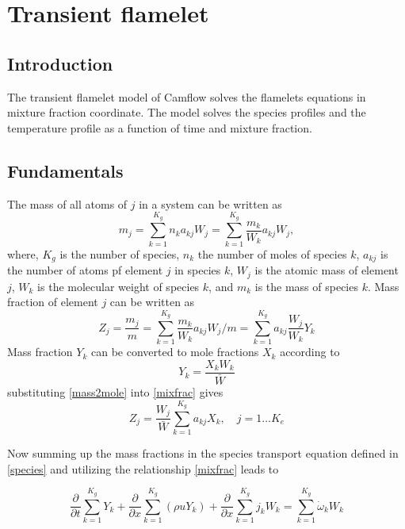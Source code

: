 \newpage
\chapter{Transient flamelet}
\section{Introduction}
The transient flamelet model of Camflow solves the flamelets equations in mixture fraction coordinate. The model solves the species profiles and the temperature profile as a function of time and mixture fraction.
\section{Fundamentals}
The mass of all atoms of $j$ in a system can be written as
\begin{equation}
 m_j = \sum_{k=1}^{K_g} n_ka_{kj}W_j = \sum_{k=1}^{K_g} \frac{m_k}{W_k}a_{kj}W_j,
\end{equation}
where, $K_g$ is the number of species, $n_k$ the number of moles of species $k$, $a_{kj}$ is the number of atoms pf element $j$ in species $k$, $W_j$ is the atomic mass of element $j$, $W_k$ is the molecular weight of species $k$, and $m_k$ is the mass of species $k$. Mass fraction of element $j$ can be written as 
\begin{equation}
 Z_j = \frac{m_j}{m} = \sum_{k=1}^{K_g} \frac{m_k}{W_k}a_{kj} W_j/m = \sum_{k=1}^{K_g} a_{kj}\frac{W_j}{W_k}Y_k
\label{mixfrac}
\end{equation}
Mass fraction $Y_k$ can be converted to mole fractions $X_k$ according to
\begin{equation}
 Y_k = \frac{X_kW_k}{\bar{W}}
\label{mass2mole}
\end{equation}
substituting \ref{mass2mole} into \ref{mixfrac} gives
\begin{equation}
 Z_j = \frac{W_j}{\bar{W}} \sum_{k=1}^{K_g} a_{kj}X_k, \quad j=1\ldots K_e
\label{mixture_frac}
\end{equation}

Now summing up the mass fractions in the species transport equation defined in \ref{species} and utilizing the relationship \ref{mixfrac} leads to

\begin{equation}
 \frac{\partial }{\partial t}\sum_{k=1}^{K_g} Y_k + \frac{\partial}{\partial x}\sum_{k=1}^{K_g} (\rho u Y_k)+ \frac{\partial}{\partial x} \sum_{k=1}^{K_g} j_kW_k = \sum_{k=1}^{K_g} \dot{\omega}_kW_k 
\end{equation}

